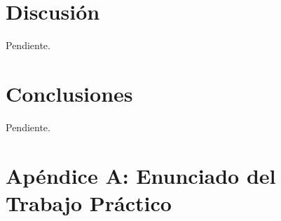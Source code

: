 \documentclass[a4paper,10pt,twoside]{article}
\begin{document}
\section{Discusión}
Pendiente.



\section{Conclusiones}
Pendiente.


\newpage

\section{Apéndice A: Enunciado del Trabajo Práctico}

\end{document}
